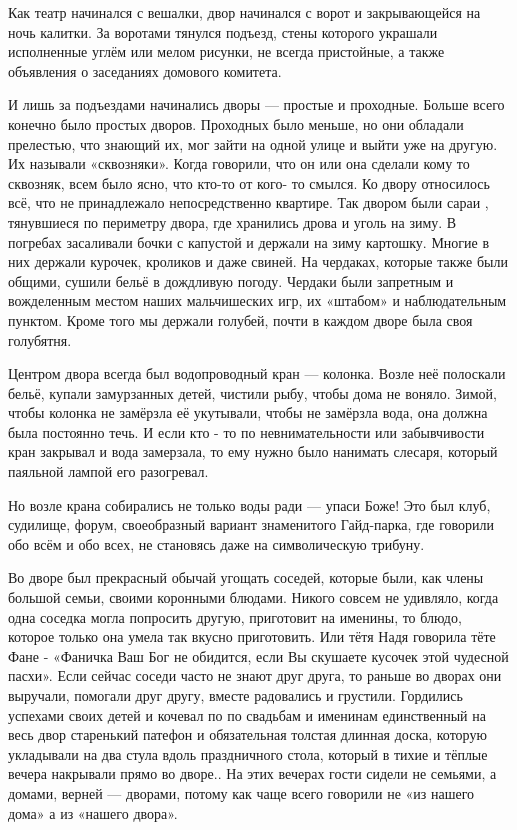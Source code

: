 Как театр начинался с вешалки, двор начинался с ворот и закрывающейся на ночь
калитки. За воротами тянулся подъезд, стены которого  украшали исполненные
углём или мелом рисунки, не всегда пристойные, а также объявления о заседаниях
домового комитета. 

И лишь за подъездами начинались дворы — простые и проходные. Больше всего
конечно было простых дворов. Проходных было меньше, но они обладали прелестью,
что знающий их, мог  зайти на одной улице и выйти уже на другую. Их называли
«сквозняки». Когда говорили, что он или она сделали  кому то  сквозняк, всем
было ясно, что кто-то от кого- то смылся. Ко двору относилось всё, что не
принадлежало  непосредственно квартире. Так двором  были сараи , тянувшиеся по
периметру двора, где хранились дрова и уголь на зиму.  В погребах засаливали
бочки с капустой и держали  на зиму картошку.  Многие в них держали курочек,
кроликов и даже свиней. На чердаках, которые также были общими, сушили бельё в
дождливую погоду. Чердаки были запретным и вожделенным местом наших
мальчишеских игр, их «штабом» и наблюдательным пунктом. Кроме того мы держали
голубей,  почти в каждом дворе была своя голубятня. 

Центром двора  всегда был водопроводный кран — колонка. Возле неё полоскали
бельё, купали замурзанных детей, чистили рыбу,  чтобы дома не воняло. Зимой,
чтобы колонка не замёрзла её укутывали, чтобы не замёрзла вода, она должна была
постоянно течь. И если кто - то по невнимательности или забывчивости кран
закрывал и вода замерзала, то ему нужно было нанимать слесаря, который паяльной
лампой его разогревал.

Но возле крана собирались не только  воды ради — упаси Боже! Это был клуб,
судилище, форум, своеобразный вариант знаменитого Гайд-парка, где говорили обо
всём и обо всех, не становясь даже на символическую трибуну.

Во дворе был прекрасный обычай угощать соседей, которые были, как члены
большой семьи, своими коронными блюдами. Никого совсем не удивляло, когда одна
соседка могла попросить другую, приготовит на именины, то блюдо, которое
только она умела так вкусно приготовить. Или тётя Надя говорила тёте Фане
-  «Фаничка Ваш Бог не обидится, если Вы скушаете кусочек этой чудесной пасхи».
Если сейчас соседи часто не знают друг друга, то раньше во дворах они выручали,
помогали друг другу, вместе радовались и грустили.  Гордились успехами  своих
детей и кочевал по по свадьбам и именинам единственный на весь двор старенький
патефон и обязательная толстая длинная доска, которую укладывали на два стула
вдоль праздничного стола, который в тихие и тёплые вечера накрывали прямо во
дворе.. На этих вечерах гости сидели не семьями, а домами, верней — дворами,
потому как чаще всего говорили не «из нашего дома» а из «нашего двора». 

